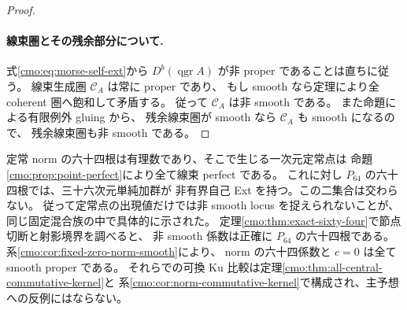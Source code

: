 \begin{proof}
\paragraph{線束圏とその残余部分について.}
式\eqref{cmo:eq:morse-self-ext}から
$D^b(\operatorname{qgr}A)$ が非 proper であることは直ちに従う。
線束生成圏 $\mathcal C_A$ は常に proper であり、
もし smooth なら定理により全 coherent 圏へ飽和して矛盾する。
従って $\mathcal C_A$ は非 smooth である。
また命題による有限例外 gluing から、
残余線束圏が smooth なら $\mathcal C_A$ も smooth になるので、
残余線束圏も非 smooth である。

\end{proof}

\begin{remark}[二種類の六十四係数]
定常 norm の六十四根は有理数であり、そこで生じる一次元定常点は
命題\ref{cmo:prop:point-perfect}により全て線束 perfect である。
これに対し $P_{64}$ の六十四根では、三十六次元単純加群が
非有界自己 Ext を持つ。この二集合は交わらない。
従って定常点の出現値だけでは非 smooth locus を捉えられないことが、
同じ固定混合族の中で具体的に示された。
定理\ref{cmo:thm:exact-sixty-four}で節点切断と射影境界を調べると、
非 smooth 係数は正確に $P_{64}$ の六十四根である。
系\ref{cmo:cor:fixed-zero-norm-smooth}により、
norm の六十四係数と $c=0$ は全て smooth proper である。
それらでの可換 Ku 比較は定理\ref{cmo:thm:all-central-commutative-kernel}と
系\ref{cmo:cor:norm-commutative-kernel}で構成され、主予想への反例にはならない。
\end{remark}
